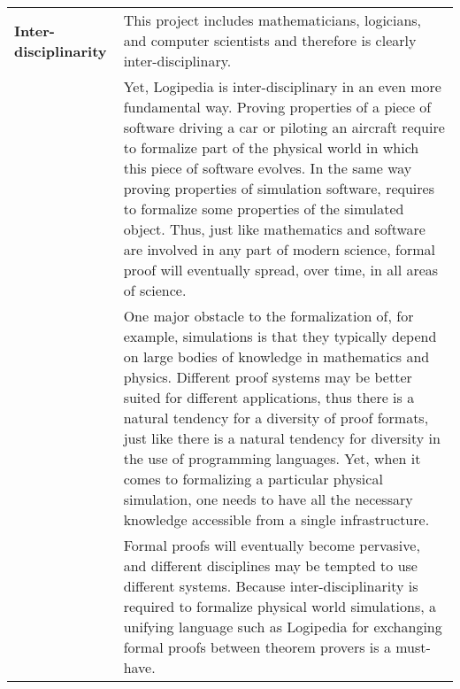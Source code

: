 \begin{longtable}{|p{}|p{}|}
\hline
{\bf Inter-disciplinarity}
&
This project includes mathematicians, logicians, and computer
scientists and therefore is clearly inter-disciplinary.\\
&
\hspace{0.4cm}
Yet, Logipedia is inter-disciplinary in an even more fundamental
way. Proving properties of a piece of software driving a car or
piloting an aircraft require to formalize part of the physical world
in which this piece of software evolves. In the same way proving
properties of simulation software, requires to formalize some
properties of the simulated object.  Thus, just like mathematics and
software are involved in any part of modern science, formal proof will
eventually spread, over time, in all areas of science.\\
&
\hspace{0.4cm}
One major obstacle to the formalization of, for example, simulations
is that they typically depend on large bodies of knowledge in
mathematics and physics.  Different proof systems may be better
suited for different applications, thus there is a natural tendency
for a diversity of proof formats, just like there is a natural
tendency for diversity in the use of programming languages.  Yet, when
it comes to formalizing a particular physical simulation, one needs to
have all the necessary knowledge accessible from a single infrastructure.\\
&
\hspace{0.4cm}
Formal proofs will eventually become pervasive, and
different disciplines may be tempted to use different systems.
Because inter-disciplinarity is required to formalize physical world
simulations, a unifying language such as Logipedia for exchanging
formal proofs between theorem provers is a must-have.\\
\hline
\end{longtable}


